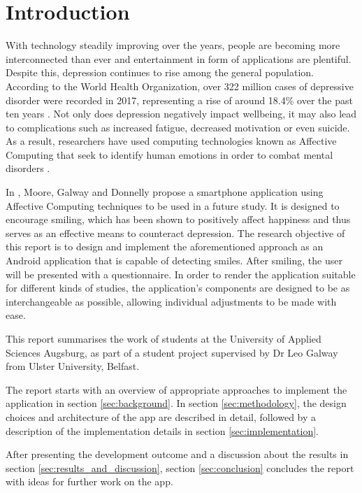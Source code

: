 \section{Introduction} \label{sec:introduction}
With technology steadily improving over the years, people are becoming more interconnected than ever and entertainment in form of applications are plentiful. Despite this, depression continues to rise among the general population.
According to the World Health Organization, over 322 million cases of depressive disorder were recorded in 2017, representing a rise of around 18.4\% over the past ten years \cite{who_depression}.
Not only does depression negatively impact wellbeing, it may also lead to complications such as increased fatigue, decreased motivation or even suicide.
As a result, researchers have used computing technologies known as Affective Computing that seek to identify human emotions in order to combat mental disorders \cite{ieee_affective}.

In \cite{sohappy}, Moore, Galway and Donnelly propose a smartphone application using Affective Computing techniques to be used in a future study.
It is designed to encourage smiling, which has been shown to positively affect happiness and thus serves as an effective means to counteract depression.
The research objective of this report is to design and implement the aforementioned approach as an Android application that is capable of detecting smiles. After smiling, the user will be presented
with a questionnaire.
In order to render the application suitable for different kinds of studies, the application's components are designed to be as interchangeable as possible, allowing individual adjustments to be made with ease.

This report summarises the work of students at the University of Applied 
Sciences Augsburg, as part of a student project supervised by Dr Leo Galway
from Ulster University, Belfast.

The report starts with an overview of appropriate approaches to implement the 
application in section \ref{sec:background}. In section \ref{sec:methodology}, 
the design choices and architecture of the app are described in detail, followed 
by a description of the implementation details in section \ref{sec:implementation}.

After presenting the development outcome and a discussion about the results in
section \ref{sec:results_and_discussion}, section \ref{sec:conclusion}
concludes the report with ideas for further work on the app.

